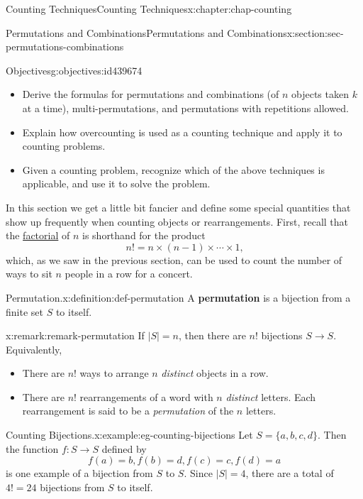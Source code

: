 \documentclass[oneside,10pt,]{book}
\newcommand{\terminology}[1]{\textbf{#1}}
\numberwithin{equation}{section}
\begin{document}
\begin{chapterptx}{Counting Techniques}{}{Counting Techniques}{}{}{x:chapter:chap-counting}
\begin{sectionptx}{Permutations and Combinations}{}{Permutations and Combinations}{}{}{x:section:sec-permutations-combinations}
\begin{objectives}{Objectives}{g:objectives:id439674}
%
\begin{itemize}[label=\textbullet]
\item{}Derive the formulas for permutations and combinations (of \(n\) objects taken \(k\) at a time), multi-permutations, and permutations with repetitions allowed.%
\item{}Explain how overcounting is used as a counting technique and apply it to counting problems.%
\item{}Given a counting problem, recognize which of the above techniques is applicable, and use it to solve the problem.%
\end{itemize}
\end{objectives}
In this section we get a little bit fancier and define some special quantities that show up frequently when counting objects or rearrangements. First, recall that the \hyperref[x:definition:def-factorial]{factorial} of \(n\) is shorthand for the product%
\begin{equation*}
n! = n \times (n-1) \times \cdots \times 1\text{,}
\end{equation*}
which, as we saw in the previous section, can be used to count the number of ways to sit \(n\) people in a row for a concert.%
\begin{definition}{Permutation.}{x:definition:def-permutation}%
A \terminology{permutation} is a bijection from a finite set \(S\) to itself.%
\end{definition}
\begin{remark}{}{x:remark:remark-permutation}%
If \(|S| = n\), then there are \(n!\) bijections \(S \rightarrow S\). Equivalently,%
\begin{itemize}[label=\textbullet]
\item{}There are \(n!\) ways to arrange \(n\) \emph{distinct} objects in a row.%
\item{}There are \(n!\) rearrangements of a word with \(n\) \emph{distinct} letters. Each rearrangement is said to be a \emph{permutation} of the \(n\) letters.%
\end{itemize}
%
\end{remark}
\begin{example}{Counting Bijections.}{x:example:eg-counting-bijections}%
Let \(S = \{a,b,c,d\}\). Then the function \(f: S \rightarrow S\) defined by%
\begin{equation*}
f(a) = b, f(b) = d, f(c) = c, f(d) = a
\end{equation*}
is one example of a bijection from \(S\) to \(S\). Since \(|S| = 4\), there are a total of \(4! = 24\) bijections from \(S\) to itself.%

\end{example}
\end{sectionptx}
\end{chapterptx}
\end{document}
